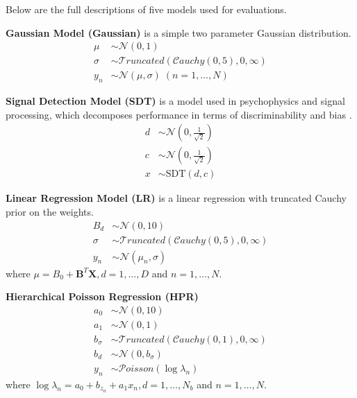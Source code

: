 Below are the full descriptions of five models used for evaluations.

\textbf{Gaussian Model (Gaussian)}
is a simple two parameter Gaussian distribution.
\begin{align}
    \mu &\sim \mathcal{N}(0, 1) \nonumber \\
    \sigma &\sim \mathcal{T}runcated(\mathcal{C}auchy(0, 5), 0, \infty) \nonumber \\
    y_n &\sim \mathcal{N}(\mu, \sigma) \; (n = 1, \dots, N) \nonumber
\end{align}

\textbf{Signal Detection Model (SDT)}
is a model used in psychophysics and signal processing, 
which decomposes performance in terms of discriminability and bias \citep{green1966signal}.
\begin{align}
d &\sim \mathcal{N}(0, \frac{1}{\sqrt{2}}) \nonumber \\
c &\sim \mathcal{N}(0, \frac{1}{\sqrt{2}}) \nonumber \\
x &\sim \text{SDT}(d, c) \nonumber
\end{align}

\textbf{Linear Regression Model (LR)}
is a linear regression with truncated Cauchy prior on the weights.
\begin{align}
    B_d &\sim \mathcal{N}(0, 10) \nonumber \\
    \sigma &\sim \mathcal{T}runcated(\mathcal{C}auchy(0, 5), 0, \infty) \nonumber \\
    y_n &\sim \mathcal{N}(\mu_n, \sigma) \nonumber
\end{align}
where $\mu = B_0 + \bm{B}^T \bm{X}, d = 1, \dots, D$ and $n = 1, \dots, N$.

\textbf{Hierarchical Poisson Regression (HPR)}
\begin{align}
    a_0 &\sim \mathcal{N}(0, 10) \nonumber \\
    a_1 &\sim \mathcal{N}(0, 1) \nonumber \\
    b_\sigma &\sim \mathcal{T}runcated(\mathcal{C}auchy(0, 1), 0, \infty) \nonumber \\
    b_d &\sim \mathcal{N}(0, b_\sigma) \nonumber \\
    y_n &\sim \mathcal{P}oisson(\log\lambda_n) \nonumber
\end{align}
where $\log\lambda_n = a_0 + b_{z_n} + a_1 x_n, d = 1, \dots, N_b$ and $n = 1, \dots, N$.

